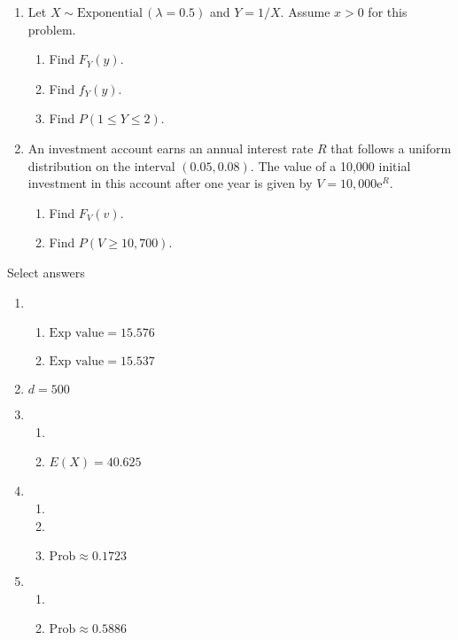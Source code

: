 \documentclass{article}
\newcommand{\follow}[1]{\sim \text{#1}\,}		%
\newcommand{\e}{\mathrm{e}}		%
\begin{document}
\begin{enumerate}
    \item Let $X \follow{Exponential}(\lambda = 0.5)$ and $Y = 1 / X$. Assume $x > 0$ for this problem.%
    \begin{enumerate}
        \item Find $F_Y(y)$.
        \item Find $f_Y(y)$.
        \item Find $P(1 \le Y \le 2)$.
    \end{enumerate}\bigskip
    
    \item An investment account earns an annual interest rate $R$ that follows a uniform distribution on the interval $(0.05, 0.08)$. The value of a 10,000 initial investment in this account after one year is given by $V = 10,000\e^R$.
    \begin{enumerate}
        \item Find $F_V(v)$.
        \item Find $P(V \ge 10,700)$.
    \end{enumerate}\bigskip
  
\end{enumerate}

\newpage

Select answers\bigskip
\begin{enumerate}
    \item 
    \begin{enumerate}
        \item $\text{Exp value} = 15.576$
        \item $\text{Exp value} = 15.537$
    \end{enumerate}
    
    \item $d = 500$
    
    \item 
    \begin{enumerate}
        \item 
        \item $E(X) = 40.625$
    \end{enumerate}
      
    \item
    \begin{enumerate}
        \item 
        \item 
        \item $\text{Prob} \approx 0.1723$
    \end{enumerate}
    
    \item 
    \begin{enumerate}
        \item 
        \item $\text{Prob} \approx 0.5886$
    \end{enumerate}
    
\end{enumerate}
    
\end{document}
